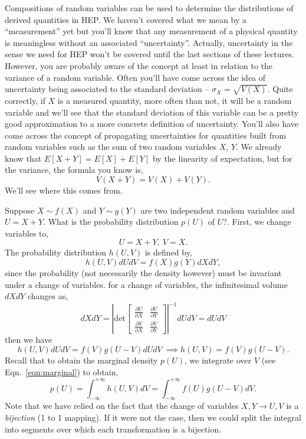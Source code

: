 Compositions of random variables can be used to determine the distributions of derived quantities in HEP. We haven't covered what we mean by a ``measurement'' yet but you'll know that any measurement of a physical quantity is meaningless without an associated  ``uncertainty''. Actually, uncertainty in the sense we need for HEP won't be covered until the last sections of these lectures. However, you are probably aware of the concept at least in relation to the variance of a random variable. Often you'll have come across the idea of uncertainty being associated to the standard deviation -- $\sigma_{X} = \sqrt{V(X)}$. Quite correctly, if $X$ is a measured quantity, more often than not, it will be a random variable and we'll see that the standard deviation of this variable can be a pretty good approximation to a more concrete definition of uncertainty. You'll also have come across the concept of propagating uncertainties for quantities built from random variables such as the sum of two random variables $X$, $Y$. We already know that $E[X+Y]=E[X]+E[Y]$ by the linearity of expectation, but for the variance, the formula you know is, 
\begin{equation}\label{eqn:quadraturesum}
    V(X+Y) = V(X)+V(Y). 
\end{equation}
We'll see where this comes from. 

Suppose $X\sim f(X)$ and $Y\sim g(Y)$ are two independent random variables and $U=X+Y$. What is the probability distribution $p(U)$ of $U$?. First, we change variables to, \begin{equation}
    U = X+Y, ~V = X. 
\end{equation}
The probability distribution $h(U,V)$ is defined by, 
\begin{equation}
    h(U,V)dUdV = f(X)g(Y)dXdY,
\end{equation}
since the probability (not necessarily the density however) must be invariant under a change of variables.  for a change of variables, the infinitesimal volume $dXdY$ changes as, 
\begin{equation}
    dXdY =  \left|\mathrm{det} \begin{bmatrix} 
    \frac{\partial U}{\partial X} & \frac{\partial U}{\partial Y}\\
    \frac{\partial V}{\partial X} & \frac{\partial V}{\partial Y}
   \end{bmatrix}\right| ^{-1} dUdV=  dUdV
\end{equation}
then we have 
\begin{equation}
    h(U,V)dUdV = f(V)g(U-V)dUdV ~\implies h(U,V) = f(V)g(U-V).
\end{equation}
Recall that to obtain the marginal density $p(U)$, we integrate over $V$ (see Eqn.~\ref{eqn:marginal}) to obtain, 
\begin{equation}\label{eqn:sumsofrandoms}
    p(U) = \int_{-\infty}^{+\infty}h(U,V)dV =  \int_{-\infty}^{+\infty}f(U)g(U-V)dV.
\end{equation}
Note that we have relied on the fact that the change of variables $X,Y\rightarrow U,V$ is a \emph{bijection} (1 to 1 mapping). If it were not the case, then we could split the integral into segments over which each transformation is a bijection. 

